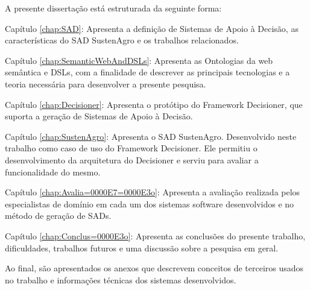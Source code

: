 A presente dissertação está estruturada da seguinte forma:

Capítulo \ref{chap:SAD}: Apresenta a definição de Sistemas de Apoio
à Decisão, as características do SAD SustenAgro e os trabalhos relacionados.

Capítulo \ref{chap:SemanticWebAndDSLs}: Apresenta as Ontologias da
web semântica e \foreignlanguage{english}{DSLs}, com a finalidade
de descrever as principais tecnologias e a teoria necessária para
desenvolver a presente pesquisa.

Capítulo \ref{chap:Decisioner}: Apresenta o protótipo do Framework
Decisioner, que suporta a geração de Sistemas de Apoio à Decisão. 

Capítulo \ref{chap:SustenAgro}: Apresenta o SAD SustenAgro. Desenvolvido
neste trabalho como caso de uso do Framework Decisioner. Ele permitiu
o desenvolvimento da arquitetura do Decisioner e serviu para avaliar
a funcionalidade do mesmo.

Capítulo \ref{chap:Avalia=0000E7=0000E3o}: Apresenta a avaliação
realizada pelos especialistas de domínio em cada um dos sistemas software
desenvolvidos e no método de geração de SADs.

Capítulo \ref{chap:Conclus=0000E3o}: Apresenta as conclusões do presente
trabalho, dificuldades, trabalhos futuros e uma discussão sobre a
pesquisa em geral.

Ao final, são apresentados os anexos que descrevem conceitos de terceiros
usados no trabalho e informações técnicas dos sistemas desenvolvidos.
